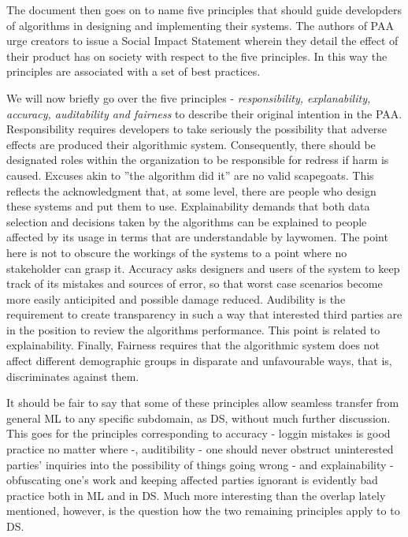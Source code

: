 \documentclass{article}
\begin{document}
The document then goes on to name five principles that should guide developders of algorithms in designing and implementing their systems. The authors of PAA urge creators to issue a Social Impact Statement wherein they detail the effect of their product has on society with respect to the five principles. In this way the principles are associated with a set of best practices.

We will now briefly go over the five principles - \emph{responsibility, explanability, accuracy, auditability and fairness} to describe their original intention in the PAA.
Responsibility requires developers to take seriously the possibility that adverse effects are produced their algorithmic system. Consequently, there should be designated roles within the organization to be responsible for redress if harm is caused. Excuses akin to ''the algorithm did it'' are no valid scapegoats. This reflects the acknowledgment that, at some level, there are people who design these systems and put them to use.
Explainability demands that both data selection and decisions taken by the algorithms can be explained to people affected by its usage in terms that are understandable by laywomen. The point here is not to obscure the workings of the systems to a point where no stakeholder can grasp it.
Accuracy asks designers and users of the system to keep track of its mistakes and sources of error, so that worst case scenarios become more easily anticipited and possible damage reduced.
Audibility is the requirement to create transparency in such a way that interested third parties are in the position to review the algorithms performance. This point is related to explainability.
Finally, Fairness requires that the algorithmic system does not affect different demographic groups in disparate and unfavourable ways, that is, discriminates against them.

It should be fair to say that some of these principles allow seamless transfer from general ML to any specific subdomain, as DS, without much further discussion.
This goes for the principles corresponding to accuracy - loggin mistakes is good practice no matter where -, auditibility - one should never obstruct uninterested parties' inquiries into the possibility of things going wrong - and explainability - obfuscating one's work and keeping affected parties ignorant is evidently bad practice both in ML and in DS.
Much more interesting than the overlap lately mentioned, however, is the question how the two remaining principles apply to to DS.
\end{document}
